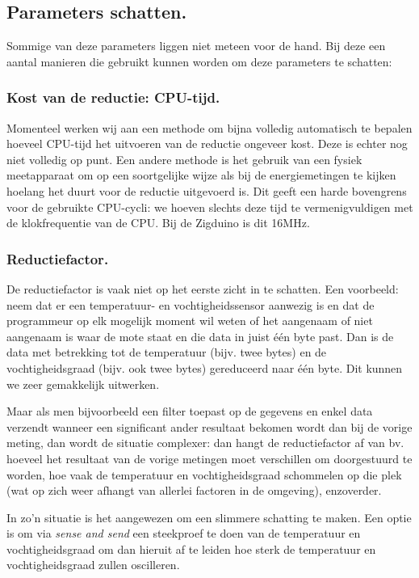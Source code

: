 \documentclass[11pt]{article}
\begin{document}
\subsection{Parameters schatten.} Sommige van deze parameters liggen niet meteen
voor de hand. Bij deze een aantal manieren die gebruikt kunnen worden om deze
parameters te schatten:

\subsubsection{Kost van de reductie: CPU-tijd.} Momenteel werken wij aan een
methode om bijna volledig automatisch te bepalen hoeveel CPU-tijd het uitvoeren
van de reductie ongeveer kost. Deze is echter nog niet volledig op punt. Een
andere methode is het gebruik van een fysiek meetapparaat om op een soortgelijke
wijze als bij de energiemetingen te kijken hoelang het duurt voor de reductie
uitgevoerd is. Dit geeft een harde bovengrens voor de gebruikte CPU-cycli: we
hoeven slechts deze tijd te vermenigvuldigen met de klokfrequentie van de
CPU. Bij de Zigduino is dit 16MHz.

\subsubsection{Reductiefactor.} De reductiefactor is vaak
niet op het eerste zicht in te schatten. Een voorbeeld: neem dat er een
temperatuur- en vochtigheidssensor aanwezig is en dat de programmeur op elk mogelijk moment
 wil weten of het aangenaam of niet aangenaam is waar de mote staat en die data
in juist één byte past. Dan is de data met betrekking tot de temperatuur (bijv.
twee bytes) en de vochtigheidsgraad (bijv. ook twee bytes) gereduceerd naar
\'e\'en byte. Dit kunnen we zeer gemakkelijk uitwerken.

Maar als men bijvoorbeeld een filter toepast op de gegevens en enkel data
verzendt wanneer een significant ander resultaat bekomen wordt dan bij de vorige
meting, dan wordt de situatie complexer: dan hangt de reductiefactor af van bv.
hoeveel het resultaat van de vorige metingen moet verschillen om doorgestuurd te
worden, hoe vaak de temperatuur en vochtigheidsgraad schommelen op die plek (wat
op zich weer afhangt van allerlei factoren in de omgeving), enzoverder.

In zo'n situatie is het aangewezen om een slimmere schatting te maken. Een optie
is om via \textit{sense and send} een steekproef te doen van de temperatuur en
vochtigheidsgraad om dan hieruit af te leiden hoe sterk de temperatuur en
vochtigheidsgraad zullen oscilleren.
\end{document}
